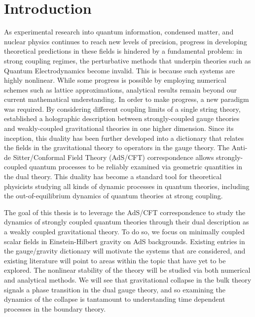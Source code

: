 \documentclass[../PhD.tex]{subfiles}
\begin{document}

\chapter{Introduction}
\label{ch: intro}

As experimental research into quantum information, condensed matter, and nuclear physics continues to reach new levels of precision, progress in developing theoretical predictions in these fields is hindered by a fundamental problem: in strong coupling regimes, the perturbative methods that underpin theories such as Quantum Electrodynamics become invalid. This is because such systems are highly nonlinear. While some progress is possible by employing numerical schemes such as lattice approximations, analytical results remain beyond our current mathematical understanding. In order to make progress, a new paradigm was required. By considering different coupling limits of a single string theory, \cite{hep-th/9711200} established a holographic description between strongly-coupled gauge theories and weakly-coupled gravitational theories in one higher dimension. Since its inception, this duality has been further developed into a dictionary that relates the fields in the gravitational theory to operators in the gauge theory. The Anti-de Sitter/Conformal Field Theory (AdS/CFT) correspondence allows strongly-coupled quantum processes to be reliably examined via geometric quantities in the dual theory. This duality has become a standard tool for theoretical physicists studying all kinds of dynamic processes in quantum theories, including the out-of-equilibrium dynamics of quantum theories at strong coupling.

The goal of this thesis is to leverage the AdS/CFT correspondence to study the dynamics of strongly coupled quantum theories through their dual description as a weakly coupled gravitational theory. To do so, we focus on minimally coupled scalar fields in Einstein-Hilbert gravity on AdS backgrounds. Existing entries in the gauge/gravity dictionary will motivate the systems that are considered, and existing literature will point to areas within the topic that have yet to be explored. The nonlinear stability of the theory will be studied via both numerical and analytical methods. We will see that gravitational collapse in the bulk theory signals a phase transition in the dual gauge theory, and so examining the dynamics of the collapse is tantamount to understanding time dependent processes in the boundary theory.
\end{document}
